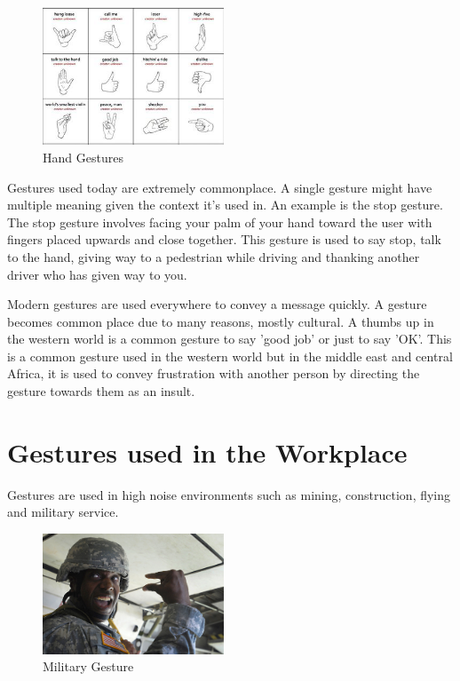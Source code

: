 \begin{figure}
  \begin{center}
    \includegraphics[width=0.48\textwidth]{img/handgesture.png}
  \end{center}
  \caption{Hand Gestures}
\end{figure}

Gestures used today are extremely commonplace. A single gesture might have multiple meaning given the context it's used in. An example is the stop gesture. The stop gesture involves facing your palm of your hand toward the user with fingers placed upwards and close together. This gesture is used to say stop, talk to the hand, giving way to a pedestrian while driving and thanking another driver who has given way to you.

Modern gestures are used everywhere to convey a message quickly. A gesture becomes common place due to many reasons, mostly cultural. A thumbs up in the western world is a common gesture to say 'good job' or just to say 'OK'. This is a common gesture used in the western world but in the middle east and central Africa, it is used to convey frustration with another person by directing the gesture towards them as an insult.

\section{Gestures used in the Workplace}
Gestures are used in high noise environments such as mining, construction, flying and military service. 

\begin{figure}
  \begin{center}
    \includegraphics[width=0.48\textwidth]{img/militarygesture.jpg}
  \end{center}
  \caption{Military Gesture}
\end{figure}

